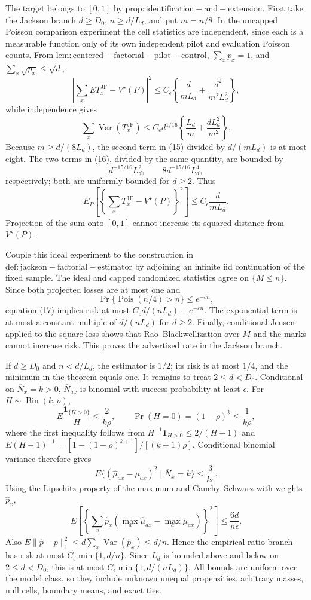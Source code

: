 The target belongs to \([0,1]\) by \(\mathrm{prop:identification-and-extension}\).  First take the Jackson branch \(d\geq D_0\), \(n\geq d/L_d\), and put \(m=n/8\).  In the uncapped Poisson comparison experiment the cell statistics are independent, since each is a measurable function only of its own independent pilot and evaluation Poisson counts.  From \(\mathrm{lem:centered-factorial-pilot-control}\), \(\sum_xp_x=1\), and \(\sum_x\sqrt{p_x}\leq\sqrt d\),
\[
 \left|\sum_xE T_x^{\mathrm{JF}}-V^\star(P)\right|^2
 \leq C_\epsilon\left\{\frac d{mL_d}+\frac{d^2}{m^2L_d^2}\right\}, \tag{15}
\]
while independence gives
\[
 \sum_x\operatorname{Var}(T_x^{\mathrm{JF}})
 \leq C_\epsilon d^{1/16}\left\{\frac{L_d}{m}+\frac{dL_d^2}{m^2}\right\}. \tag{16}
\]
Because \(m\geq d/(8L_d)\), the second term in (15) divided by \(d/(mL_d)\) is at most eight.  The two terms in (16), divided by the same quantity, are bounded by
\[
 d^{-15/16}L_d^2,\qquad 8d^{-15/16}L_d^4,
\]
respectively; both are uniformly bounded for \(d\geq2\).  Thus
\[
 E_P\left[\left\{\sum_xT_x^{\mathrm{JF}}-V^\star(P)\right\}^2\right]
 \leq C_\epsilon\frac d{mL_d}.                                      \tag{17}
\]
Projection of the sum onto \([0,1]\) cannot increase its squared distance from \(V^\star(P)\).

Couple this ideal experiment to the construction in \(\mathrm{def:jackson-factorial-estimator}\) by adjoining an infinite iid continuation of the fixed sample.  The ideal and capped randomized statistics agree on \(\{M\leq n\}\).  Since both projected losses are at most one and
\[
 \Pr\{\operatorname{Pois}(n/4)>n\}\leq e^{-c n},
\]
equation (17) implies risk at most \(C_\epsilon d/(nL_d)+e^{-cn}\).  The exponential term is at most a constant multiple of \(d/(nL_d)\) for \(d\geq2\).  Finally, conditional Jensen applied to the square loss shows that Rao--Blackwellization over \(M\) and the marks cannot increase risk.  This proves the advertised rate in the Jackson branch.

If \(d\geq D_0\) and \(n<d/L_d\), the estimator is \(1/2\); its risk is at most \(1/4\), and the minimum in the theorem equals one.  It remains to treat \(2\leq d<D_0\).  Conditional on \(\overline N_x=k>0\), \(\overline N_{ax}\) is binomial with success probability at least \(\epsilon\).  For \(H\sim\operatorname{Bin}(k,\rho)\),
\[
 E\frac{\mathbf1_{\{H>0\}}}{H}\leq\frac2{k\rho},\qquad
 \Pr(H=0)=(1-\rho)^k\leq\frac1{k\rho},
\]
where the first inequality follows from \(H^{-1}\mathbf1_{H>0}\leq2/(H+1)\) and
\(E(H+1)^{-1}=[1-(1-\rho)^{k+1}]/[(k+1)\rho]\).  Conditional binomial variance therefore gives
\[
 E\{(\widehat\mu_{ax}-\mu_{ax})^2\mid\overline N_x=k\}\leq\frac3{k\epsilon}.
\]
Using the Lipschitz property of the maximum and Cauchy--Schwarz with weights \(\widehat p_x\),
\[
 E\left[\left\{\sum_x\widehat p_x(\max_a\widehat\mu_{ax}-\max_a\mu_{ax})\right\}^2\right]
 \leq\frac{6d}{n\epsilon}.
\]
Also \(E\|\widehat p-p\|_1^2\leq d\sum_x\operatorname{Var}(\widehat p_x)\leq d/n\).  Hence the empirical-ratio branch has risk at most \(C_\epsilon\min\{1,d/n\}\).  Since \(L_d\) is bounded above and below on \(2\leq d<D_0\), this is at most \(C_\epsilon\min\{1,d/(nL_d)\}\).  All bounds are uniform over the model class, so they include unknown unequal propensities, arbitrary masses, null cells, boundary means, and exact ties.